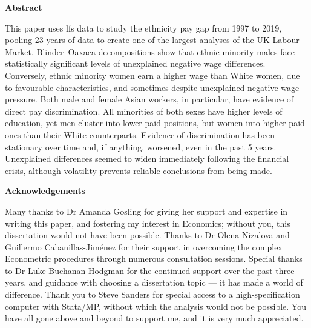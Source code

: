 \documentclass[class=article, crop=false]{standalone}
\begin{document}
\thispagestyle{plain}
\begin{center}
   \textbf{Abstract} 
\end{center}
This paper uses \acrlong{lfs} data to study the ethnicity pay gap from 1997 to 2019, pooling 23 years of data to create one of the largest analyses of the UK Labour Market. Blinder–Oaxaca decompositions show that ethnic minority males face statistically significant levels of unexplained negative wage differences. Conversely, ethnic minority women earn a higher wage than White women, due to favourable characteristics, and sometimes despite unexplained negative wage pressure. Both male and female Asian workers, in particular, have evidence of  direct pay discrimination. All minorities of both sexes have higher levels of education, yet men cluster into lower-paid positions, but women into higher paid ones than their White counterparts. Evidence of discrimination has been stationary over time and, if anything, worsened, even in the past 5 years. Unexplained differences seemed to widen immediately following the financial crisis, although volatility prevents reliable conclusions from being made.


\vspace{50pt}
\begin{center}
   \textbf{Acknowledgements}
\end{center}
\linebreak
Many thanks to Dr Amanda Gosling for giving her support and expertise in writing this paper, and fostering my interest in Economics; without you, this dissertation would not have been possible. Thanks to Dr Olena Nizalova and Guillermo Cabanillas-Jiménez for their support in overcoming the complex Econometric procedures through numerous consultation sessions. Special thanks to Dr Luke Buchanan-Hodgman for the continued support over the past three years, and guidance with choosing a dissertation topic --- it has made a world of difference. Thank you to Steve Sanders for special access to a high-specification computer with Stata/MP, without which the analysis would not be possible. You have all gone above and beyond to support me, and it is very much appreciated.
\end{document}
